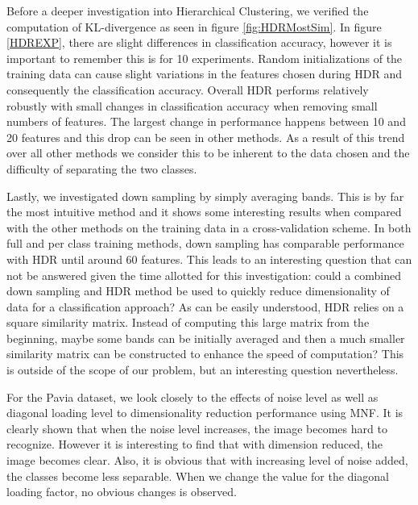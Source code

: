 \documentclass[conference,onecolumn]{IEEEtran}
\begin{document}
Before a deeper investigation into Hierarchical Clustering, we verified the computation of KL-divergence as seen in figure \ref{fig:HDRMostSim}. In figure \ref{HDREXP}, there are slight differences in classification accuracy, however it is important to remember this is for 10 experiments. Random initializations of the training data can cause slight variations in the features chosen during HDR and consequently the classification accuracy. Overall HDR performs relatively robustly with small changes in classification accuracy when removing small numbers of features. The largest change in performance happens between 10 and 20 features and this drop can be seen in other methods. As a result of this trend over all other methods we consider this to be inherent to the data chosen and the difficulty of separating the two classes.

Lastly, we investigated down sampling by simply averaging bands. This is by far the most intuitive method and it shows some interesting results when compared with the other methods on the training data in a cross-validation scheme. In both full and per class training methods, down sampling has comparable performance with HDR until around 60 features. This leads to an interesting question that can not be answered given the time allotted for this investigation: could a combined down sampling and HDR method be used to quickly reduce dimensionality of data for a classification approach? As can be easily understood, HDR relies on a square similarity matrix. Instead of computing this large matrix from the beginning, maybe some bands can be initially averaged and then a much smaller similarity matrix can be constructed to enhance the speed of computation? This is outside of the scope of our problem, but an interesting question nevertheless.

For the Pavia dataset, we look closely to the effects of noise level as well as diagonal loading level to dimensionality reduction performance using MNF. It is clearly shown that when the noise level increases, the image becomes hard to recognize. However it is interesting to find that with dimension reduced, the image becomes clear. Also, it is obvious that with increasing level of noise added, the classes become less separable. When we change the value for the diagonal loading factor, no obvious changes is observed.



\end{document}
